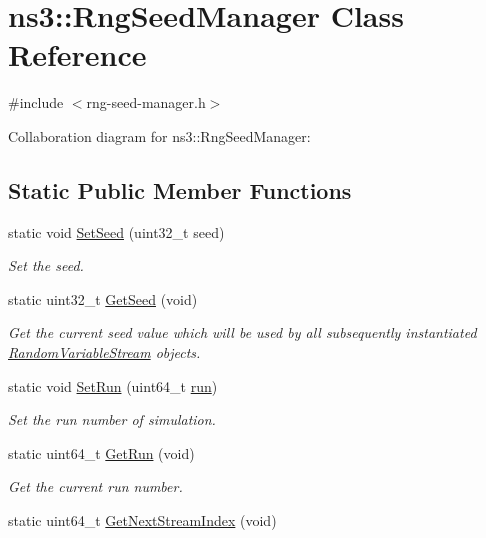 \hypertarget{classns3_1_1RngSeedManager}{}\section{ns3\+:\+:Rng\+Seed\+Manager Class Reference}
\label{classns3_1_1RngSeedManager}


{\ttfamily \#include $<$rng-\/seed-\/manager.\+h$>$}



Collaboration diagram for ns3\+:\+:Rng\+Seed\+Manager\+:
\subsection*{Static Public Member Functions}
\begin{DoxyCompactItemize}
\item 
static void \hyperlink{classns3_1_1RngSeedManager_ab2a95901871c7b47a3dcf0f70adc58f4}{Set\+Seed} (uint32\+\_\+t seed)
\begin{DoxyCompactList}\small\item\em Set the seed. \end{DoxyCompactList}\item 
static uint32\+\_\+t \hyperlink{classns3_1_1RngSeedManager_a09f2d185f02aac599cd5a244c4b73ba5}{Get\+Seed} (void)
\begin{DoxyCompactList}\small\item\em Get the current seed value which will be used by all subsequently instantiated \hyperlink{classns3_1_1RandomVariableStream}{Random\+Variable\+Stream} objects. \end{DoxyCompactList}\item 
static void \hyperlink{classns3_1_1RngSeedManager_a14c9a839f8141b0e9ec2af0e96d68263}{Set\+Run} (uint64\+\_\+t \hyperlink{generate__test__data__lte__spectrum__value__txpsd_8m_a093eaf8ac95b223aafb28e4668160d1f}{run})
\begin{DoxyCompactList}\small\item\em Set the run number of simulation. \end{DoxyCompactList}\item 
static uint64\+\_\+t \hyperlink{classns3_1_1RngSeedManager_afaf1b845d2523df05ca341a930de24b3}{Get\+Run} (void)
\begin{DoxyCompactList}\small\item\em Get the current run number. \end{DoxyCompactList}\item 
static uint64\+\_\+t \hyperlink{classns3_1_1RngSeedManager_ac109366285260eb4c1e124862d2fd4ad}{Get\+Next\+Stream\+Index} (void)
\end{DoxyCompactItemize}
